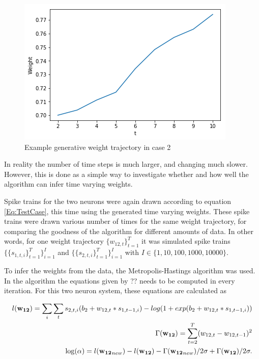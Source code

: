 \begin{figure}
\caption{Example generative weight trajectory in case 2}
\label{fig:Generative}
    \centering
    \includegraphics[scale=0.8]{fig/UL.png}
\end{figure}


In reality the number of time steps is much larger, and changing much slower. However, this is done as a simple way to investigate whether and how well the algorithm can infer time varying weights. 

Spike trains for the two neurons were again drawn according to equation \ref{Eq:TestCase}, this time using the generated time varying weights. These spike trains were drawn various number of times for the same weight trajectory, for comparing the goodness of the algorithm for different amounts of data. In other words, for one weight trajectory $\{w_{12,t}\}_{t=1}^T$ it was simulated spike trains
$\{\{s_{1,t,i}\}_{t=1}^T\}_{i=1}^I$ and $\{\{s_{2,t,i}\}_{t=1}^T\}_{i=1}^I$ with $I \in \{1,10,100,1000,10000 \}$.

To infer the weights from the data, the Metropolis-Hastings algorithm was used. In the algorithm the equations given by ?? needs to be computed in every iteration. For this two neuron system, these equations are calculated as

\begin{equation}
\begin{split}
    l({\bf w_{12}}) = \sum_i \sum_t s_{2,t,i}(b_2 + w_{12,t}*s_{1,t-1,i}) - log(1 + exp(b_2 + w_{12,t} * s_{1,t-1,i})) \\
    \Gamma({\bf w_{12}}) = \sum_{t=2}^T (w_{12,t} - w_ {12,t-1})^2\\
    \log ( \alpha) = l({\bf w_{12}}_{new}) - l({\bf w_{12}}) - \Gamma({\bf w_{12}}_{new})/2\sigma + \Gamma({\bf w_{12}})/2\sigma.
\end{split}
\end{equation}

